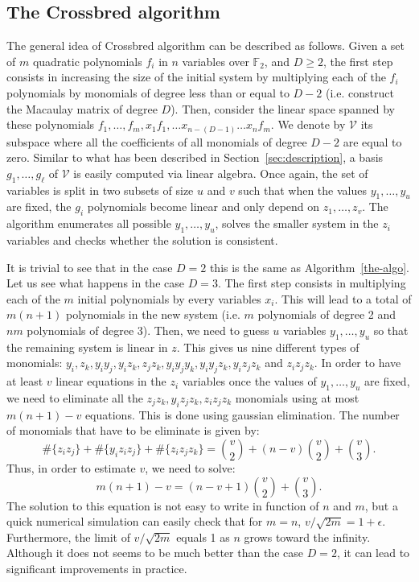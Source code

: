 \documentclass[a4paper,UKenglish,cleveref, autoref]{lipics-v2019}
\begin{document}
\subsection{The \textsf{Crossbred} algorithm}\label{sec:JV}

The general idea of \textsf{Crossbred} algorithm can be described as follows.
Given a set of $m$ quadratic polynomials $f_i$ in $n$ variables over $\mathbb{F}_2$, 
and $D \geq 2$, the first step consists in
increasing the size of the initial system by multiplying each of the $f_i$
polynomials by monomials of degree less than or equal to $D-2$ 
(i.e. construct the Macaulay matrix of degree $D$).
Then, consider the linear space spanned 
by these polynomials $f_1, \dots, f_m, x_1f_1, \dots x_{n-(D-1)}\dots x_{n}f_m$. 
We denote by $\mathcal{V}$ its subspace where all the coefficients of all 
monomials of degree $D -2$ are equal to zero. Similar to what has been 
described in Section~\ref{sec:description}, a basis $g_1, \dots, g_\ell$ of
$\mathcal{V}$ is easily computed via linear algebra. Once again, the set of variables
is split in two subsets of size $u$ and $v$ such that when the values $y_1, \dots, y_u$
are fixed, the $g_i$ polynomials become linear and only depend on $z_1, \dots, z_v$.
The algorithm enumerates all possible $y_1, \dots, y_u$, solves the smaller system in the $z_i$
variables and checks whether the solution is consistent.

It is trivial to see that in the case $D=2$ this is the same as Algorithm~\ref{the-algo}.
Let us see what happens in the case $D=3$. The first step consists in multiplying each of
the $m$ initial polynomials by every variables $x_i$. This will lead to a total of
$m(n+1)$ polynomials in the new system (i.e. $m$ polynomials of degree 2 and $nm$ polynomials
of degree 3). Then, we need to guess $u$ variables $y_1, \dots, y_u$ so that the remaining system
is linear in $z$. This gives us nine different types of monomials:
$y_i, z_k, y_iy_j, y_iz_k, z_jz_k, y_iy_jy_k, y_iy_jz_k, y_iz_jz_k$ and $z_iz_jz_k$.
In order to have at least $v$ linear equations in the $z_i$ variables once the values of $y_1, \dots, y_u$
are fixed, we need to eliminate all the $z_jz_k, y_iz_jz_k, z_iz_jz_k$ monomials using at 
most $m(n+1) - v$ equations. This is done using gaussian elimination. The number of monomials that 
have to be eliminate is given by:
\[
  \#\{z_iz_j\} + \#\{y_iz_iz_j\} +\#\{z_iz_jz_k\}
 = \binom{v}{2} + (n-v)\binom{v}{2} +\binom{v}{3}.
\]
Thus, in order to estimate $v$, we need to solve:
\[
 m(n+1) -v = (n-v +1)\binom{v}{2} + \binom{v}{3}.
\]
The solution to this equation is not easy to write in function of $n$ and $m$, but a quick
numerical simulation can easily check that for $m=n$, $v/\sqrt{2m} = 1+\epsilon$. Furthermore,
the limit of $v/\sqrt{2m}$ equals 1 as $n$ grows toward the infinity. Although it does not seems
to be much better than the case $D=2$, it can lead to significant improvements in
practice.
\end{document}
